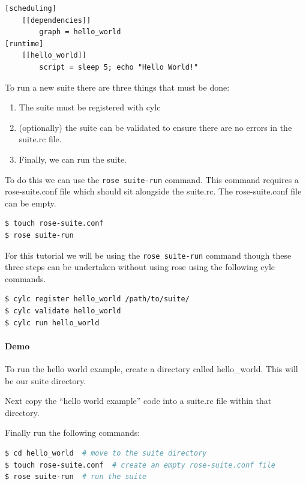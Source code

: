 \begin{lstlisting}[language=suiterc, title=hello world example]
[scheduling]
    [[dependencies]]
        graph = hello_world
[runtime]
    [[hello_world]]
        script = sleep 5; echo "Hello World!"
\end{lstlisting}

To run a new suite there are three things that must be done:

\begin{enumerate}
    \item The suite must be registered with cylc
    \item (optionally) the suite can be validated to ensure there are no errors
            in the suite.rc file.
    \item Finally, we can run the suite.
\end{enumerate}

To do this we can use the \lstinline[language=bash]{rose suite-run} command.
This command requires a rose-suite.conf file which should sit alongside the
suite.rc. The rose-suite.conf file can be empty.

\begin{lstlisting}[language=bash]
$ touch rose-suite.conf
$ rose suite-run
\end{lstlisting}

For this tutorial we will be using the \lstinline{rose suite-run} command
though these three steps can be undertaken without using rose using the
following cylc commands.

\begin{lstlisting}[language=bash]
$ cylc register hello_world /path/to/suite/
$ cylc validate hello_world
$ cylc run hello_world
\end{lstlisting}

\paragraph*{Demo}
To run the hello world example, create a directory called hello\_world. This
will be our suite directory.

Next copy the ``hello world example'' code into a suite.rc file within that
directory.

Finally run the following commands:

\begin{lstlisting}[language=bash]
$ cd hello_world  # move to the suite directory
$ touch rose-suite.conf  # create an empty rose-suite.conf file
$ rose suite-run  # run the suite
\end{lstlisting}

